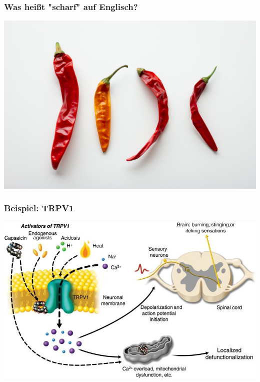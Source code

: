 \documentclass{beamer}
\begin{document}
\begin{frame}
\frametitle{Was heißt "scharf" auf Englisch?}

\begin{center}
    \includegraphics[width=\textwidth]{k8-innLvzxxiEg-unsplash.jpg}
\end{center}

\end{frame}

\begin{frame}
\frametitle{Beispiel: TRPV1}

\begin{center}
\includegraphics[width=\textwidth]{Activation_of_TRPV1_by_capsaicin.jpg}
\end{center}



\end{frame}

\end{document}
